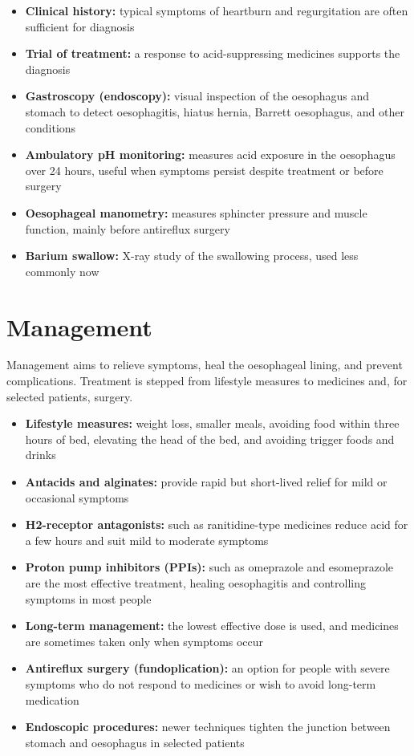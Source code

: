 \begin{itemize}
    \item \textbf{Clinical history:} typical symptoms of heartburn and regurgitation are often sufficient for diagnosis
    \item \textbf{Trial of treatment:} a response to acid-suppressing medicines supports the diagnosis
    \item \textbf{Gastroscopy (endoscopy):} visual inspection of the oesophagus and stomach to detect oesophagitis, hiatus hernia, Barrett oesophagus, and other conditions
    \item \textbf{Ambulatory pH monitoring:} measures acid exposure in the oesophagus over 24 hours, useful when symptoms persist despite treatment or before surgery
    \item \textbf{Oesophageal manometry:} measures sphincter pressure and muscle function, mainly before antireflux surgery
    \item \textbf{Barium swallow:} X-ray study of the swallowing process, used less commonly now
\end{itemize}

\section*{Management}
Management aims to relieve symptoms, heal the oesophageal lining, and prevent complications. Treatment is stepped from lifestyle measures to medicines and, for selected patients, surgery.

\begin{itemize}
    \item \textbf{Lifestyle measures:} weight loss, smaller meals, avoiding food within three hours of bed, elevating the head of the bed, and avoiding trigger foods and drinks
    \item \textbf{Antacids and alginates:} provide rapid but short-lived relief for mild or occasional symptoms
    \item \textbf{H2-receptor antagonists:} such as ranitidine-type medicines reduce acid for a few hours and suit mild to moderate symptoms
    \item \textbf{Proton pump inhibitors (PPIs):} such as omeprazole and esomeprazole are the most effective treatment, healing oesophagitis and controlling symptoms in most people
    \item \textbf{Long-term management:} the lowest effective dose is used, and medicines are sometimes taken only when symptoms occur
    \item \textbf{Antireflux surgery (fundoplication):} an option for people with severe symptoms who do not respond to medicines or wish to avoid long-term medication
    \item \textbf{Endoscopic procedures:} newer techniques tighten the junction between stomach and oesophagus in selected patients
\end{itemize}

